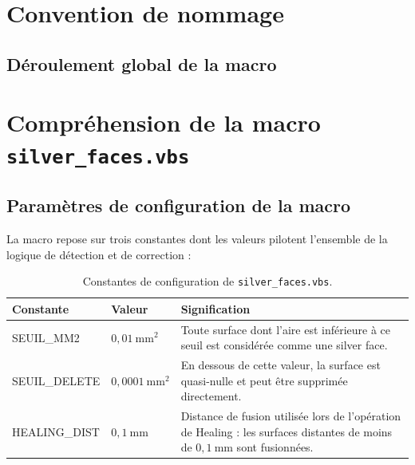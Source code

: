 \section{Convention de nommage}
\label{sec:naming-macro}

\subsection{Déroulement global de la macro}
\label{subsec:nm-deroulement}


\section{Compréhension de la macro \texttt{silver\_faces.vbs}}
\label{sec:silver-faces-macro}

\subsection{Paramètres de configuration de la macro}
\label{subsec:sf-constantes}

La macro repose sur trois constantes dont les valeurs pilotent l'ensemble de la logique de détection et de correction :

\begin{table}[htbp]
\centering
\caption{Constantes de configuration de \texttt{silver\_faces.vbs}.}
\label{tab:sf-constantes}
\begin{tabularx}{\textwidth}{llX}
\toprule
\textbf{Constante} & \textbf{Valeur} & \textbf{Signification} \\
\midrule
SEUIL\_MM2    & \(0{,}01\ \text{mm}^2\)   & Toute surface dont l'aire est inférieure à ce seuil est considérée comme une silver face. \\
SEUIL\_DELETE & \(0{,}0001\ \text{mm}^2\) & En dessous de cette valeur, la surface est quasi-nulle et peut être supprimée directement. \\
HEALING\_DIST & \(0{,}1\ \text{mm}\)       & Distance de fusion utilisée lors de l'opération de Healing : les surfaces distantes de moins de \(0{,}1\ \text{mm}\) sont fusionnées. \\
\bottomrule
\end{tabularx}
\end{table}

